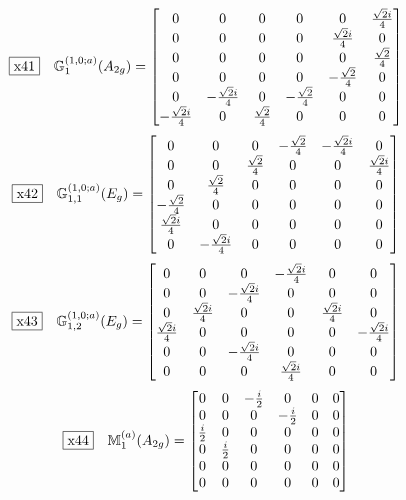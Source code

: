 \documentclass[fleqn,10pt,landscape]{jsarticle}
\begin{document}
\begin{dmath*}
\fbox{x41}\quad \mathbb{G}_{1}^{(1,0;a)}(A_{2g})=\begin{bmatrix} 0 & 0 & 0 & 0 & 0 & \frac{\sqrt{2} i}{4} \\ 0 & 0 & 0 & 0 & \frac{\sqrt{2} i}{4} & 0 \\ 0 & 0 & 0 & 0 & 0 & \frac{\sqrt{2}}{4} \\ 0 & 0 & 0 & 0 & - \frac{\sqrt{2}}{4} & 0 \\ 0 & - \frac{\sqrt{2} i}{4} & 0 & - \frac{\sqrt{2}}{4} & 0 & 0 \\ - \frac{\sqrt{2} i}{4} & 0 & \frac{\sqrt{2}}{4} & 0 & 0 & 0 \end{bmatrix}
\end{dmath*}
\begin{dmath*}
\fbox{x42}\quad \mathbb{G}_{1,1}^{(1,0;a)}(E_{g})=\begin{bmatrix} 0 & 0 & 0 & - \frac{\sqrt{2}}{4} & - \frac{\sqrt{2} i}{4} & 0 \\ 0 & 0 & \frac{\sqrt{2}}{4} & 0 & 0 & \frac{\sqrt{2} i}{4} \\ 0 & \frac{\sqrt{2}}{4} & 0 & 0 & 0 & 0 \\ - \frac{\sqrt{2}}{4} & 0 & 0 & 0 & 0 & 0 \\ \frac{\sqrt{2} i}{4} & 0 & 0 & 0 & 0 & 0 \\ 0 & - \frac{\sqrt{2} i}{4} & 0 & 0 & 0 & 0 \end{bmatrix}
\end{dmath*}
\begin{dmath*}
\fbox{x43}\quad \mathbb{G}_{1,2}^{(1,0;a)}(E_{g})=\begin{bmatrix} 0 & 0 & 0 & - \frac{\sqrt{2} i}{4} & 0 & 0 \\ 0 & 0 & - \frac{\sqrt{2} i}{4} & 0 & 0 & 0 \\ 0 & \frac{\sqrt{2} i}{4} & 0 & 0 & \frac{\sqrt{2} i}{4} & 0 \\ \frac{\sqrt{2} i}{4} & 0 & 0 & 0 & 0 & - \frac{\sqrt{2} i}{4} \\ 0 & 0 & - \frac{\sqrt{2} i}{4} & 0 & 0 & 0 \\ 0 & 0 & 0 & \frac{\sqrt{2} i}{4} & 0 & 0 \end{bmatrix}
\end{dmath*}
\begin{dmath*}
\fbox{x44}\quad \mathbb{M}_{1}^{(a)}(A_{2g})=\begin{bmatrix} 0 & 0 & - \frac{i}{2} & 0 & 0 & 0 \\ 0 & 0 & 0 & - \frac{i}{2} & 0 & 0 \\ \frac{i}{2} & 0 & 0 & 0 & 0 & 0 \\ 0 & \frac{i}{2} & 0 & 0 & 0 & 0 \\ 0 & 0 & 0 & 0 & 0 & 0 \\ 0 & 0 & 0 & 0 & 0 & 0 \end{bmatrix}
\end{dmath*}
\end{document}
